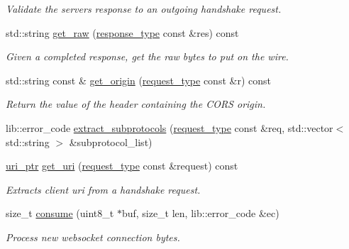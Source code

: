 \begin{DoxyCompactItemize}
\begin{DoxyCompactList}\small\item\em Validate the server\textquotesingle{}s response to an outgoing handshake request. \end{DoxyCompactList}\item 
std\+::string \hyperlink{classwebsocketpp_1_1processor_1_1hybi13_afa475db4728d11e2640d173e4e5b3216}{get\+\_\+raw} (\hyperlink{classwebsocketpp_1_1processor_1_1hybi13_a5d918ca9c9aa6c38a145f2ef1d2aa38a}{response\+\_\+type} const \&res) const 
\begin{DoxyCompactList}\small\item\em Given a completed response, get the raw bytes to put on the wire. \end{DoxyCompactList}\item 
std\+::string const \& \hyperlink{classwebsocketpp_1_1processor_1_1hybi13_a186c07c4c4edbcfa13fbb1eafbf75fed}{get\+\_\+origin} (\hyperlink{classwebsocketpp_1_1processor_1_1hybi13_aaf7438e06dfb60da29ef201f8c8cf2dd}{request\+\_\+type} const \&r) const 
\begin{DoxyCompactList}\small\item\em Return the value of the header containing the C\+O\+R\+S origin. \end{DoxyCompactList}\item 
lib\+::error\+\_\+code \hyperlink{classwebsocketpp_1_1processor_1_1hybi13_a3d3b0e51df97cd7c8dcde00fb3003a34}{extract\+\_\+subprotocols} (\hyperlink{classwebsocketpp_1_1processor_1_1hybi13_aaf7438e06dfb60da29ef201f8c8cf2dd}{request\+\_\+type} const \&req, std\+::vector$<$ std\+::string $>$ \&subprotocol\+\_\+list)
\item 
\hyperlink{namespacewebsocketpp_aae370ea5ac83a8ece7712cb39fc23f5b}{uri\+\_\+ptr} \hyperlink{classwebsocketpp_1_1processor_1_1hybi13_a22741f2bfe1bb6cbc1ccaa332b5d5c16}{get\+\_\+uri} (\hyperlink{classwebsocketpp_1_1processor_1_1hybi13_aaf7438e06dfb60da29ef201f8c8cf2dd}{request\+\_\+type} const \&request) const 
\begin{DoxyCompactList}\small\item\em Extracts client uri from a handshake request. \end{DoxyCompactList}\item 
size\+\_\+t \hyperlink{classwebsocketpp_1_1processor_1_1hybi13_a5c5e3234a0067c7f14fe0ceb4e647659}{consume} (uint8\+\_\+t $\ast$buf, size\+\_\+t len, lib\+::error\+\_\+code \&ec)
\begin{DoxyCompactList}\small\item\em Process new websocket connection bytes. \end{DoxyCompactList}\item 

\end{DoxyCompactItemize}
